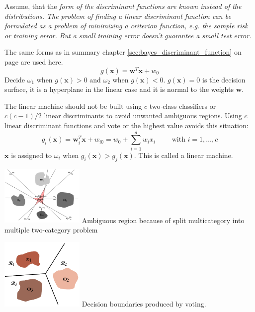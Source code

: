   Assume, that the \em form \em of the discriminant functions are known instead of the
  distributions. The problem of finding a linear discriminant function can be formulated as a problem
  of \em minimizing a criterion function\em, e.g. \em the sample risk \em or \em training error\em.
  But a small training error doesn't guarantee a small \em test error\em.
  

      The same forms as in summary chapter \ref{sec:bayes_discriminant_function} on page 
      \pageref{sec:bayes_discriminant_function} are used here.
      $$g(\bm x) = \bm w ^T \bm x + w_0$$
      Decide $\omega_1$ when $g(\bm x) > 0$ and $\omega_2$ when $g(\bm x) < 0$. $g(\bm x) = 0$ is
      the decision surface, it is a hyperplane in the linear case and it is normal to the weights 
      $\bm w$.
      
    \begin{minipage}{10.5cm}
      The linear machine should not be built using $c$ two-class classifiers or $c(c-1)/2$ linear
      discriminants to avoid unwanted ambiguous regions. Using $c$ linear discriminant 
      functions and vote or the highest value avoids this situation:
      $$g_i(\bm x) = \bm w_i^T \bm x + w_{i0} = w_0 + \sum\limits_{i=1}^d w_i x_i 
      \qquad \text{ with } i=1,\ldots,c$$
      $\bm x$ is assigned to $\omega_i$ when $g_i(\bm x) > g_j(\bm x)$. This is
      called a linear machine.
    \end{minipage}
    \begin{minipage}{4cm}
    	 \includegraphics[width=4cm]{./images/ambiguousRegion.png}
    	 Ambiguous region because of split multicategory into multiple two-category problem
    \end{minipage}
    \hspace{1mm}
    \begin{minipage}{4cm}
    	\includegraphics[width=4cm]{./images/regionWithVote.png}
    	Decision boundaries produced by voting.\\
    \end{minipage}
      
